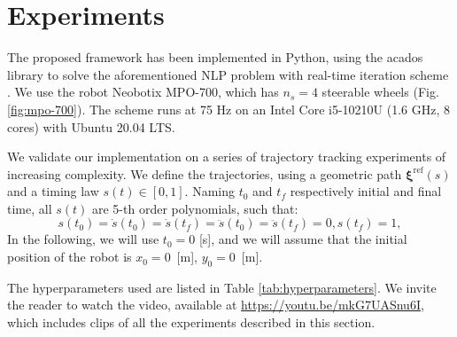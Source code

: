 
\section{Experiments}
\label{sec:simulations-and-experiments}
The proposed framework has been implemented in Python, using the acados library
\cite{Verschueren2021acados} to solve the aforementioned NLP problem with
real-time iteration scheme \cite{Gros2020Fromlineartononlinear}. We use the
robot Neobotix MPO-700, which has $n_s=4$ steerable wheels
(Fig. \ref{fig:mpo-700}). The scheme runs at 75 Hz on an Intel Core i5-10210U
(1.6 GHz, 8 cores) with Ubuntu 20.04 LTS.

We validate our implementation on a series of trajectory tracking experiments
of increasing complexity. We define the trajectories, using a geometric path
$\bm{\xi}^{\mathrm{ref}}(s)$ and a timing law $s(t) \in [0, 1]$. Naming $t_0$
and $t_f$ respectively initial and final time, all $s(t)$ are 5-th order
polynomials, such that:
\begin{equation*}
s(t_0) = \dot{s}(t_0) = \dot{s}(t_f) = \ddot{s}(t_0) = \ddot{s}(t_f)=0, s(t_f)=1,
\end{equation*}
In the following, we will use $t_0 = 0$ [s], and we will assume that the initial
position of the robot is $x_0 = 0$~[m], $y_0 = 0$~[m].

The hyperparameters used are listed in Table \ref{tab:hyperparameters}.
We invite the reader to watch the video, available at
\url{https://youtu.be/mkG7UASnu6I}, which includes 
clips of all the experiments described in this section.

